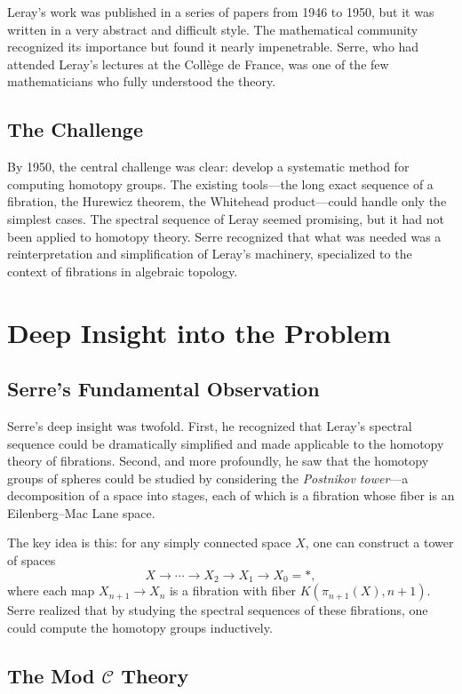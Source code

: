 Leray's work was published in a series of papers from 1946 to 1950, but it was written in a very abstract and difficult style. The mathematical community recognized its importance but found it nearly impenetrable. Serre, who had attended Leray's lectures at the Collège de France, was one of the few mathematicians who fully understood the theory.

\subsection{The Challenge}

By 1950, the central challenge was clear: develop a systematic method for computing homotopy groups. The existing tools---the long exact sequence of a fibration, the Hurewicz theorem, the Whitehead product---could handle only the simplest cases. The spectral sequence of Leray seemed promising, but it had not been applied to homotopy theory. Serre recognized that what was needed was a reinterpretation and simplification of Leray's machinery, specialized to the context of fibrations in algebraic topology.

\section{Deep Insight into the Problem}

\subsection{Serre's Fundamental Observation}

Serre's deep insight was twofold. First, he recognized that Leray's spectral sequence could be dramatically simplified and made applicable to the homotopy theory of fibrations. Second, and more profoundly, he saw that the homotopy groups of spheres could be studied by considering the \emph{Postnikov tower}---a decomposition of a space into stages, each of which is a fibration whose fiber is an Eilenberg--Mac Lane space.

The key idea is this: for any simply connected space $X$, one can construct a tower of spaces
\[
X \to \cdots \to X_2 \to X_1 \to X_0 = *,
\]
where each map $X_{n+1} \to X_n$ is a fibration with fiber $K(\pi_{n+1}(X), n+1)$. Serre realized that by studying the spectral sequences of these fibrations, one could compute the homotopy groups inductively.

\subsection{The Mod \texorpdfstring{$\mathcal{C}$}{C} Theory}

